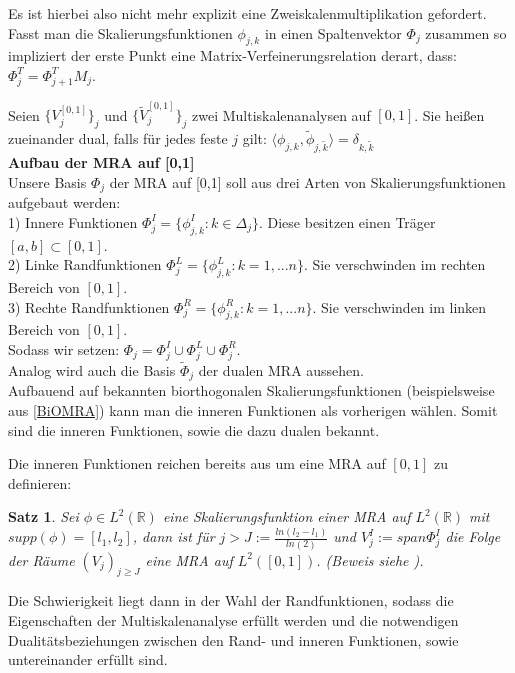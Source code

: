 \documentclass[11pt,a4paper,titlepage]{article}
\theoremstyle{plain} %
\newtheorem{satz}{Satz}[section] %
\newcommand{\skalar}[2]{\langle #1, #2\rangle}
\theoremstyle{definition} %
\numberwithin{equation}{section} %
\begin{document}
		
		Es ist hierbei also nicht mehr explizit eine Zweiskalenmultiplikation gefordert. Fasst man die Skalierungsfunktionen $\phi_{j,k}$ in einen Spaltenvektor $\Phi_j$ zusammen so impliziert der erste Punkt eine Matrix-Verfeinerungsrelation derart, dass: $\Phi^T_j=\Phi^T_{j+1} M_j$.
		
		Seien $\{V^{[0,1]}_j\}_j$ und $\{\tilde{V}^{[0,1]}_j\}_j$ zwei Multiskalenanalysen auf $[0,1]$. Sie heißen zueinander dual, falls für jedes feste $j$ gilt:
		$\skalar{\phi_{j,k}}{\tilde{\phi}_{j,\tilde{k}}}=\delta_{k,\tilde{k}}$\\
	
	\textbf{Aufbau der MRA auf [0,1]}\\
	Unsere Basis $\Phi_j$ der MRA auf [0,1] soll aus drei Arten von Skalierungsfunktionen aufgebaut werden:\\
	1) Innere Funktionen $\Phi^I_j=\{\phi^I_{j,k}: k\in \Delta_j \}$. Diese besitzen einen Träger $[a,b]\subset[0,1]$. \\
	2) Linke Randfunktionen $\Phi^L_j=\{\phi^L_{j,k}: k=1,...n\}$. Sie verschwinden im rechten Bereich von $[0,1]$.\\
	3) Rechte Randfunktionen $\Phi^R_j=\{\phi^R_{j,k}: k=1,...n\}$. Sie verschwinden im linken Bereich von $[0,1]$.\\

	Sodass wir setzen: $\Phi_j=\Phi^I_j \cup \Phi^L_j \cup \Phi^R_j$.\\
	Analog wird auch die Basis $\tilde{\Phi}_j$ der dualen MRA aussehen.\\
		
	Aufbauend auf bekannten biorthogonalen Skalierungsfunktionen (beispielsweise aus \ref{BiOMRA}) kann man die inneren Funktionen als vorherigen wählen.
	Somit sind die inneren Funktionen, sowie die dazu dualen bekannt.
	
	Die inneren Funktionen reichen bereits aus um eine MRA auf $[0,1]$ zu definieren:
	\begin{satz}
		Sei $\phi\in L^2(\mathbb{R})$ eine Skalierungsfunktion einer MRA auf $L^2(\mathbb{R})$ mit $supp(\phi)=[l_1,l_2]$, dann ist für $j>J:=\frac{ln(l_2-l_1)}{ln(2)}$ und  
		$V_j^I:=span \Phi_j^I$ die Folge der Räume $(V_j)_{j\ge J}$ eine MRA auf $L^2([0,1])$. (Beweis siehe \cite{Primbs2006}).
	\end{satz}
	
	Die Schwierigkeit liegt dann in der Wahl der Randfunktionen, sodass die Eigenschaften der Multiskalenanalyse erfüllt werden und die notwendigen Dualitätsbeziehungen zwischen den Rand- und inneren Funktionen, sowie untereinander erfüllt sind. \\
	
\end{document}
